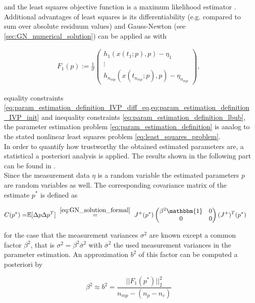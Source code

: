 \documentclass{scrartcl}[12pt, halfparskip]
\numberwithin{equation}{section}
\numberwithin{figure}{section}
\numberwithin{table}{section}
\begin{document}
and the least squares objective function is a maximum likelihood estimator \cite{disseration_andreas_sommer}. Additional advantages of least squares is its differentiability (e.g. compared to sum over absolute residuum values) and Gauss-Newton (see \cref{sec:GN_numerical_solution}) can be applied as with

\begin{align}
F_1(p) := \frac{1}{\sigma}
\begin{pmatrix}
h_1(x(t_1;p),p) - \eta_1 \\
\vdots \\
h_{n_{mp}}(x(t_{n_{mp}};p),p) - \eta_{n_{mp}}
\end{pmatrix},
\end{align}

equality constraints \cref{eq:param_estimation_definition_IVP_diff_eq,eq:param_estimation_definition_IVP_init} and inequality constraints \cref{eq:param_estimation_definition_lbub}, the parameter estimation problem \cref{eq:param_estimation_definition} is analog to the stated nonlinear least squares problem \cref{eq:least_squares_problem}. \\

In order to quantify how trustworthy the obtained estimated parameters are, a statistical a posteriori analysis is applied. The results shown in the following part can be found in \cite{diss_bock}. \\
Since the measurement data $\eta$ is a random variable the estimated parameters $p$ are random variables as well. The corresponding covariance matrix of the estimate $p^*$ is defined as

\begin{align}
	C(p^*) = & \mathbb{E} [ \Delta p \Delta p^T ]
	\ \stackrel{\cref{eq:GN_solution_formal}}{=} \ J^+(p^*)
	\begin{pmatrix}
	\beta^2  \mathbbm{1} & 0 \\
	0 & 0
	\end{pmatrix}
	(J^+)^T(p^*) 
	\label{eq:stat_ana_covariance_matrix}
\end{align}

for the case that the measurement variances $\sigma^2$ are known except a common factor $\beta^2$, that is $\sigma^2 = \beta^2 \bar{\sigma}^2$ with $\bar{\sigma}^2$ the used measurement variances in the parameter estimation. An approximation $b^2$ of this factor can be computed a posteriori by

\begin{equation}
	\beta^2 \approx b^2 = \frac{|| F_1(p^*) ||_2^2}{n_{mp} - (n_p - n_c)}
\end{equation}
\end{document}
